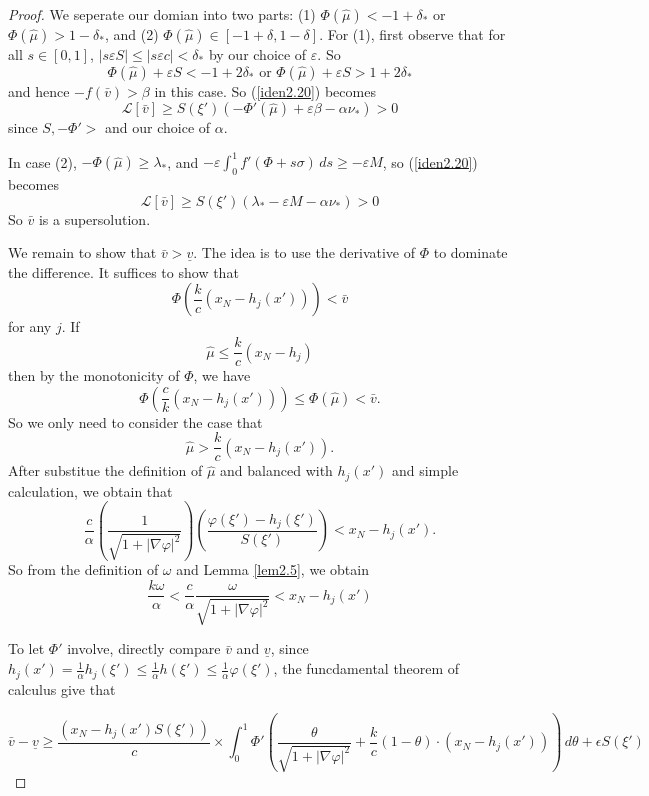 \documentclass[12pt, a4paper]{article}
\numberwithin{equation}{section}
\renewcommand{\L}{\mathcal{L}}
\newcommand{\hmu}{\hat{\mu}}
\begin{document}
\begin{CJK}{UTF8}{bkai}
\begin{proof}
We seperate our domian into two parts: (1) $\Phi(\hmu)<-1+\delta_*$ or $\Phi(\hmu)>1-\delta_*$, and (2) $\Phi(\hmu)\in[-1+\delta,1-\delta]$.
For (1), first observe that for all $s\in[0,1]$, $|s\varepsilon S|\leq |s\varepsilon c|<\delta_*$ by our choice of $\varepsilon$. So
\[
	\Phi(\hmu)+\varepsilon S<-1+2\delta_*\mbox{ or }\Phi(\hmu)+\varepsilon S>1+2\delta_*
\]
and hence $-f(\bar{v})>\beta$ in this case. So (\ref{iden2.20}) becomes
\[
	\L[\bar{v}]\geq S(\xi')\left(-\Phi'(\hmu)+\varepsilon\beta-\alpha\nu_*\right)>0
\]
since $S,-\Phi'>$ and our choice of $\alpha$.

In case (2), $-\Phi(\hmu)\geq\lambda_*$, and $-\varepsilon\int_0^1f'(\Phi+s\sigma)\,ds\geq-\varepsilon M$, so (\ref{iden2.20}) becomes
\[
	\L[\bar{v}]\geq S(\xi')\left(\lambda_*-\varepsilon M-\alpha\nu_*\right)>0
\]
So $\bar{v}$ is a supersolution.


	We remain to show that $\bar{v}>\underline{v}$. The idea is to use the derivative of $\Phi$ to dominate the difference. It suffices to show that
\begin{equation}
	\Phi\left(\frac{k}{c}(x_N-h_j(x'))\right)<\bar{v}
\end{equation}
for any $j$. If 
\[
	\hmu\leq \frac{k}{c}(x_N-h_j)
\]
then by the monotonicity of $\Phi$, we have
\[
	\Phi\left(\frac{c}{k}(x_N-h_j(x'))\right)\leq\Phi(\hmu)<\bar{v}.
\]
So we only need to consider the case that
\[
	\hmu>\frac{k}{c}(x_N-h_j(x')).
\]
After substitue the definition of $\hmu$ and balanced with $h_j(x')$ and simple calculation, we obtain that
\[
	\frac{c}{\alpha}\left(\frac{1}{\sqrt{1+|\nabla\varphi|^2}}\right)\left(\frac{\varphi(\xi')-h_j(\xi')}{S(\xi')}\right)<x_N-h_j(x').
\]
So from the definition of $\omega$ and Lemma \ref{lem2.5}, we obtain
\begin{equation}\label{iden2.24}
	\frac{k\omega}{\alpha}<\frac{c}{\alpha}\frac{\omega}{\sqrt{1+|\nabla\varphi|^2}}<x_N-h_j(x')
\end{equation}

To let $\Phi'$ involve, directly compare $\bar{v}$ and $\underline{v}$,  since $h_j(x')=\frac{1}{\alpha}h_j(\xi')\leq\frac{1}{\alpha}h(\xi')\leq\frac{1}{\alpha}\varphi(\xi')$, the funcdamental theorem of calculus give that

\[
	\bar{v}-\underline{v}\geq\frac{(x_N-h_j(x')S(\xi'))}{c}\times\int_0^1\Phi'\left(\frac{\theta}{\sqrt{1+|\nabla\varphi|^2}}+\frac{k}{c}(1-\theta)\cdot(x_N-h_j(x'))\right)\,d\theta+\epsilon S(\xi')
\]


\end{proof}
\end{CJK}
\end{document}
